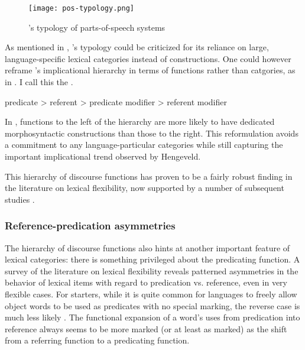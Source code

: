 \begin{figure}[h]
  \centering
  \texttt{[image: pos-typology.png]}
  \caption[Hengeveld's typology of parts-of-speech systems]{\citeauthor{Hengeveld1992}'s \parencite*[69]{Hengeveld1992} typology of parts-of-speech systems}
  \label{fig:Hengeveld-pos-systems}
\end{figure}

As mentioned in , \citeauthor{Hengeveld1992}'s typology could be criticized for its reliance on large, language-specific lexical categories instead of constructions. One could however reframe \citeauthor{Hengeveld1992}'s implicational hierarchy in terms of functions rather than catgories, as in . I call this the .

\begin{exe}
  \ex\label{ex:2.9} predicate > referent > predicate modifier > referent modifier
\end{exe}

\noindent In , functions to the left of the hierarchy are more likely to have dedicated morphosyntactic constructions than those to the right. This reformulation avoids a commitment to any language-particular categories while still capturing the important implicational trend observed by Hengeveld.

This hierarchy of discourse functions has proven to be a fairly robust finding in the literature on lexical flexibility, now supported by a number of subsequent studies \parencites{Anward2000}{Rijkhoff2000}{Vogel2000}{Beck2002}{Rijkhoff2002}{Rijkhoff2003}{HengeveldRijkhoffSiewierska2004}{Lier2006}{Hengeveld2007}{HengeveldLier2012}{HengeveldValstar2010}{Beck2013}{Bisang2013}{Hengeveld2013}.

\subsubsection{Reference-predication asymmetries}
\label{sec:2.3.2.2}

The hierarchy of discourse functions also hints at another important feature of lexical categories: there is something privileged about the predicating function. A survey of the literature on lexical flexibility reveals patterned asymmetries in the behavior of lexical items with regard to predication vs. reference, even in very flexible cases. For starters, while it is quite common for languages to freely allow object words to be used as predicates with no special marking, the reverse case is much less likely \textcite[745]{HopperThompson1984}. The functional expansion of a word's uses from predication into reference always seems to be more marked (or at least as marked) as the shift from a referring function to a predicating function.

